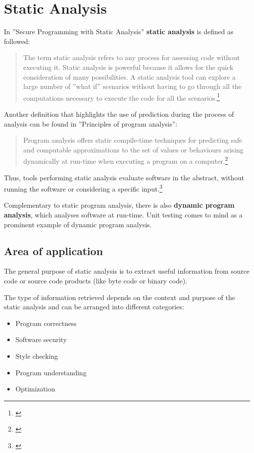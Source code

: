 \chapter{Static Analysis}

In ''Secure Programming with Static Analysis'' \textbf{static analysis} is defined as followed:

\begin{quotation}
The term static analysis refers to any process for assessing code without
executing it. Static analysis is powerful because it allows for the quick consideration of many possibilities. A static analysis tool can explore a large number of ''what if'' scenarios without having to go through all the computations
necessary to execute the code for all the scenarios.\footnote{\citep[3]{SecureProgramming}}
\end{quotation}

Another definition that highlights the use of prediction during the process of analysis can be found in ''Principles of program analysis'':

\begin{quotation}
Program analysis offers static compile-time techniques for predicting safe and computable approximations to the set of values or behaviours arising dynamically at run-time when executing a program on a computer.\footnote{\citep[1]{ProgramAnalysis}}
\end{quotation}

Thus, tools performing static analysis evaluate software in the abstract, without running the software or considering a specific input.\footnote{\citep{UsingSAToFindBugs}}

Complementary to static program analysis, there is also \textbf{dynamic program analysis}, which analyses software at run-time. Unit testing comes to mind as a prominent example of dynamic program analysis.

\section{Area of application}

The general purpose of static analysis is to extract useful information from source code or source code products (like byte code or binary code).

The type of information retrieved depends on the context and purpose of the static analysis and can be arranged into different categories:

\begin{itemize}\addtolength{\itemsep}{-0.5\baselineskip}
\item Program correctness
\item Software security
\item Style checking
\item Program understanding
\item Optimization
\end{itemize}

